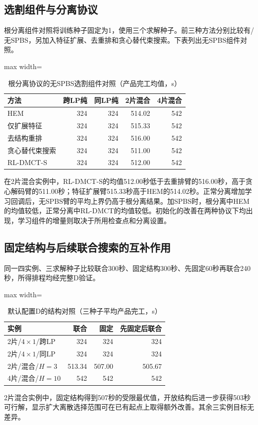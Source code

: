 \subsection{选割组件与分离协议}
根分离组件对照将训练种子固定为1，使用三个求解种子。前三种方法分别比较有/无SPBS，另加入特征扩展、去重排和贪心替代束搜索。下表列出无SPBS组件对照。
\begin{table}[!htbp]
\centering\small
\caption{根分离协议的无SPBS选割组件对照（产品完工均值，s）}
\label{tab:journal-components-cn}

\begin{adjustbox}{max width=\linewidth}
\begin{tabular}{lrrrr}\toprule
方法 & 跨LP纯 & 同LP纯 & 2片混合 & 4片混合\\\midrule
HEM & 324 & 324 & 514.02 & 542\\
仅扩展特征 & 324 & 324 & 515.33 & 542\\
去结构重排 & 324 & 324 & 516.00 & 542\\
贪心替代束搜索 & 324 & 324 & 511.00 & 542\\
RL-DMCT-S & 324 & 324 & 512.00 & 542\\
\bottomrule\end{tabular}
\end{adjustbox}
\end{table}
在2片混合实例中，RL-DMCT-S的均值512.00秒低于去重排臂的516.00秒，高于贪心解码臂的511.00秒；特征扩展臂515.33秒高于HEM的514.02秒。正常分离增加学习回调后，无SPBS臂的平均上界仍高于根分离结果。加SPBS时，根分离中HEM的均值较低，正常分离中RL-DMCT的均值较低。初始化的改善在两种协议下均出现，学习组件的增量则取决于所用检查点和分离设置。
\subsection{固定结构与后续联合搜索的互补作用}
同一四实例、三求解种子比较联合300秒、固定结构300秒、先固定60秒再联合240秒，所得排程均经完整D验证。
\begin{table}[!htbp]
\centering\small
\caption{默认配置D的结构对照（三种子平均产品完工，s）}
\label{tab:journal-structure-cn}
\begin{adjustbox}{max width=\linewidth}
\begin{tabular}{lrrr}\toprule
实例 & 联合 & 固定 & 先固定后联合\\\midrule
2片/$4\times1$/跨LP & 324 & 324 & 324\\
2片/$4\times1$/同LP & 324 & 324 & 324\\
2片/混合/$H=3$ & 513.34 & 507.00 & 505.67\\
4片/混合/$H=10$ & 542 & 542 & 542\\
\bottomrule\end{tabular}
\end{adjustbox}
\end{table}
2片混合实例中，固定结构得到507秒的受限最优值，开放结构后进一步获得503秒可行解，显示扩大离散选择范围可在已有起点上取得额外改善。其余三实例目标无差异。

